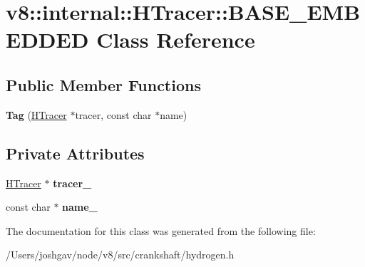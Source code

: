\hypertarget{classv8_1_1internal_1_1_h_tracer_1_1_b_a_s_e___e_m_b_e_d_d_e_d}{}\section{v8\+:\+:internal\+:\+:H\+Tracer\+:\+:B\+A\+S\+E\+\_\+\+E\+M\+B\+E\+D\+D\+ED Class Reference}
\label{classv8_1_1internal_1_1_h_tracer_1_1_b_a_s_e___e_m_b_e_d_d_e_d}
\subsection*{Public Member Functions}
\begin{DoxyCompactItemize}
\item 
{\bfseries Tag} (\hyperlink{classv8_1_1internal_1_1_h_tracer}{H\+Tracer} $\ast$tracer, const char $\ast$name)\hypertarget{classv8_1_1internal_1_1_h_tracer_1_1_b_a_s_e___e_m_b_e_d_d_e_d_abbdaaa667f44097b90b85ba983861dd3}{}\label{classv8_1_1internal_1_1_h_tracer_1_1_b_a_s_e___e_m_b_e_d_d_e_d_abbdaaa667f44097b90b85ba983861dd3}

\end{DoxyCompactItemize}
\subsection*{Private Attributes}
\begin{DoxyCompactItemize}
\item 
\hyperlink{classv8_1_1internal_1_1_h_tracer}{H\+Tracer} $\ast$ {\bfseries tracer\+\_\+}\hypertarget{classv8_1_1internal_1_1_h_tracer_1_1_b_a_s_e___e_m_b_e_d_d_e_d_a69f94b30466d2c2f622ff7bf4cb0080f}{}\label{classv8_1_1internal_1_1_h_tracer_1_1_b_a_s_e___e_m_b_e_d_d_e_d_a69f94b30466d2c2f622ff7bf4cb0080f}

\item 
const char $\ast$ {\bfseries name\+\_\+}\hypertarget{classv8_1_1internal_1_1_h_tracer_1_1_b_a_s_e___e_m_b_e_d_d_e_d_af25c73fe23bfedafe46adca132d61bf2}{}\label{classv8_1_1internal_1_1_h_tracer_1_1_b_a_s_e___e_m_b_e_d_d_e_d_af25c73fe23bfedafe46adca132d61bf2}

\end{DoxyCompactItemize}


The documentation for this class was generated from the following file\+:\begin{DoxyCompactItemize}
\item 
/\+Users/joshgav/node/v8/src/crankshaft/hydrogen.\+h\end{DoxyCompactItemize}
